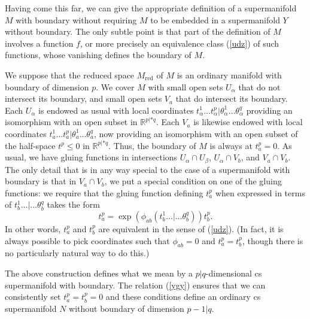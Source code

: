 \documentclass[11pt,a4paper]{article}
\def\red{{\mathrm{red}}}
\def\R{{\mathbb R}}
\begin{document}
Having come this far, we can give the appropriate definition of a supermanifold $M$ with boundary  without requiring $M$ to be embedded in a supermanifold $Y$ without boundary.
The only subtle point is that part of the definition of $M$ involves a function $f$, or more precisely an equivalence class (\ref{udz}) of such functions, whose vanishing defines the boundary of $M$.

We suppose that the reduced space $M_\red$ of $M$ is an ordinary manifold with boundary of dimension $p$.  
We cover $M$  with small open sets $U_\alpha$ that do not intersect its boundary, and small open sets $V_a$
that do intersect its boundary.  Each $U_\alpha$ is endowed as usual with 
local coordinates $t^1_\alpha\dots t^p_\alpha|\theta^1_\alpha\dots \theta_\alpha^q$ providing an isomorphism with an open
subset in $\R^{p|*q}$.    Each $V_a$ is likewise endowed with local coordinates $t^1_a\dots t^p_a|\theta^1_a\dots \theta^q_a$, now providing an isomorphism with an open subset of
the half-space $t^p\leq 0$ in $\R^{p|*q}$. Thus, the boundary of $M$ is always at $t^p_a=0$.  As usual, we have gluing functions in intersections $U_\alpha\cap U_\beta$, $U_\alpha\cap V_b$, and $V_a\cap V_b$.  The only
detail that is in any way special to the case of a supermanifold with boundary is that in $V_a\cap V_b$, we put
a special condition on one of the gluing functions:
we require that the gluing function defining $t^p_a$ when expressed in terms of $t^1_b\dots|\dots \theta^q_b$ takes
the form 
\begin{equation}\label{ygy}t^p_a=\exp(\phi_{ab}(t^1_b\dots|\dots\theta^q_b))t^p_b.\end{equation}
In other words, $t^p_a$ and $t^p_b$ are equivalent in the sense of  (\ref{udz}).  (In fact,  it is always possible to pick coordinates such that $\phi_{ab}=0$ and $t^p_a=t^p_b$,
though there is no particularly natural way to do this.)  

The above construction defines what we mean by a $p|q$-dimensional cs supermanifold  with boundary.  The relation (\ref{ygy}) ensures that we can consistently set $t^p_a=t^p_b=0$ and
these conditions define an ordinary  cs  supermanifold $N$ without boundary of dimension $p-1|q$.   
\end{document}
